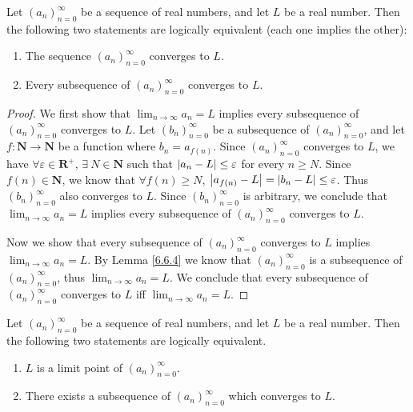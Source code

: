 \begin{proposition}\label{6.6.5}
    Let \((a_n)_{n = 0}^\infty\) be a sequence of real numbers, and let \(L\) be a real number.
    Then the following two statements are logically equivalent (each one implies the other):
    \begin{enumerate}
        \item The sequence \((a_n)_{n = 0}^\infty\) converges to \(L\).
        \item Every subsequence of \((a_n)_{n = 0}^\infty\) converges to \(L\).
    \end{enumerate}
\end{proposition}

\begin{proof}
    We first show that \(\lim_{n \to \infty} a_n = L\) implies every subsequence of \((a_n)_{n = 0}^\infty\) converges to \(L\).
    Let \((b_n)_{n = 0}^\infty\) be a subsequence of \((a_n)_{n = 0}^\infty\), and let \(f : \mathbf{N} \to \mathbf{N}\) be a function where \(b_n = a_{f(n)}\).
    Since \((a_n)_{n = 0}^\infty\) converges to \(L\), we have \(\forall \varepsilon \in \mathbf{R}^+\), \(\exists\ N \in \mathbf{N}\) such that \(\abs*{a_n - L} \leq \varepsilon\) for every \(n \geq N\).
    Since \(f(n) \in \mathbf{N}\), we know that \(\forall f(n) \geq N\), \(\abs*{a_{f(n)} - L} = \abs*{b_n - L} \leq \varepsilon\).
    Thus \((b_n)_{n = 0}^\infty\) also converges to \(L\).
    Since \((b_n)_{n = 0}^\infty\) is arbitrary, we conclude that \(\lim_{n \to \infty} a_n = L\) implies every subsequence of \((a_n)_{n = 0}^\infty\) converges to \(L\).

    Now we show that every subsequence of \((a_n)_{n = 0}^\infty\) converges to \(L\) implies \(\lim_{n \to \infty} a_n = L\).
    By Lemma \ref{6.6.4} we know that \((a_n)_{n = 0}^\infty\) is a subsequence of \((a_n)_{n = 0}^\infty\), thus \(\lim_{n \to \infty} a_n = L\).
    We conclude that every subsequence of \((a_n)_{n = 0}^\infty\) converges to \(L\) iff \(\lim_{n \to \infty} a_n = L\).
\end{proof}

\begin{proposition}\label{6.6.6}
    Let \((a_n)_{n = 0}^\infty\) be a sequence of real numbers, and let \(L\) be a real number.
    Then the following two statements are logically equivalent.
    \begin{enumerate}
        \item \(L\) is a limit point of \((a_n)_{n = 0}^\infty\).
        \item There exists a subsequence of \((a_n)_{n = 0}^\infty\) which converges to \(L\).
    \end{enumerate}
\end{proposition}

